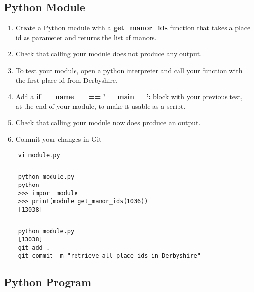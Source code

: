 \subsection{Python Module}  %

\begin{enumerate}
    \item Create a Python module with a \textbf{get\_manor\_ids} function
          that takes a place id as parameter and returns the list of manors.
    \item Check that calling your module does not produce any output.
    \item To test your module, open a python interpreter and call your function with
          the first place id from Derbyshire.
    \item Add a \textbf{if \_\_name\_\_ == '\_\_main\_\_':} block with your previous test,
          at the end of your module, to make it usable as a script.
    \item Check that calling your module now does produce an output.
    \item Commit your changes in Git
\end{enumerate}

\ifdefined\answer
\begin{verbatim}
    vi module.py
\end{verbatim}
\inputminted[firstline=1,lastline=11]{python}{TD4_Python_Linux_similarities_answers_python_module.py}
\begin{verbatim}
    python module.py
    python
    >>> import module
    >>> print(module.get_manor_ids(1036))
    [13038]
\end{verbatim}
\inputminted[]{python}{TD4_Python_Linux_similarities_answers_python_module.py}
\begin{verbatim}
    python module.py
    [13038]
    git add .
    git commit -m "retrieve all place ids in Derbyshire"
\end{verbatim}
\fi

\subsection{Python Program}  %

